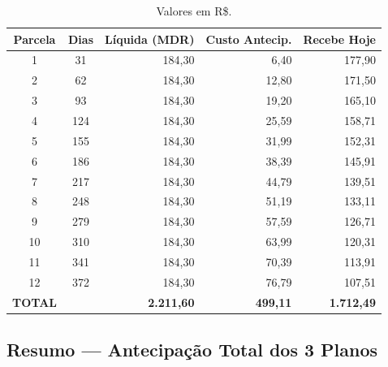 \documentclass[12pt, a4paper]{article}
\begin{document}
\begin{table}[H]
    \centering
    \footnotesize
    \renewcommand{\arraystretch}{1.3}
    \begin{tabularx}{\textwidth}{c c r r r}
        \toprule
        \rowcolor{tableHeader} \textbf{Parcela} & \textbf{Dias} & \textbf{Líquida (MDR)} & \textbf{Custo Antecip.} & \textbf{Recebe Hoje} \\
        \midrule
        1 & 31 & 184,30 & 6,40 & 177,90 \\
        \rowcolor{lightGray}
        2 & 62 & 184,30 & 12,80 & 171,50 \\
        3 & 93 & 184,30 & 19,20 & 165,10 \\
        \rowcolor{lightGray}
        4 & 124 & 184,30 & 25,59 & 158,71 \\
        5 & 155 & 184,30 & 31,99 & 152,31 \\
        \rowcolor{lightGray}
        6 & 186 & 184,30 & 38,39 & 145,91 \\
        7 & 217 & 184,30 & 44,79 & 139,51 \\
        \rowcolor{lightGray}
        8 & 248 & 184,30 & 51,19 & 133,11 \\
        9 & 279 & 184,30 & 57,59 & 126,71 \\
        \rowcolor{lightGray}
        10 & 310 & 184,30 & 63,99 & 120,31 \\
        11 & 341 & 184,30 & 70,39 & 113,91 \\
        \rowcolor{lightGray}
        12 & 372 & 184,30 & 76,79 & 107,51 \\
        \midrule
        \rowcolor{dangerRed!10}
        \textbf{TOTAL} & & \textbf{2.211,60} & \textbf{499,11} & \textbf{1.712,49} \\
        \bottomrule
    \end{tabularx}
    \caption*{\footnotesize Valores em R\$.}
\end{table}

\needspace{8cm}

\subsection{Resumo — Antecipação Total dos 3 Planos}
\end{document}
